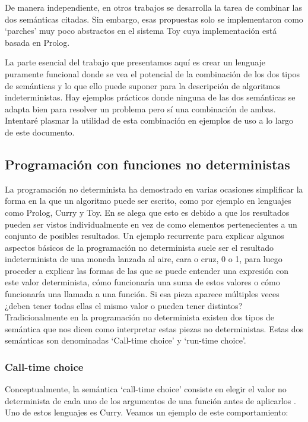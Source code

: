 \documentclass[class=article, crop=false]{standalone}
\begin{document}
De manera independiente, en otros trabajos \cite{riesco2014singular} se desarrolla la tarea
de combinar las dos semánticas citadas. Sin embargo, esas propuestas solo se implementaron
como `parches' muy poco abstractos en el sistema Toy cuya implementación está basada en
Prolog.

La parte esencial del trabajo que presentamos aquí es crear un lenguaje puramente funcional
donde se vea el potencial de la combinación de los dos tipos de semánticas y lo que ello
puede suponer para la descripción de algoritmos indeterministas. Hay ejemplos prácticos donde
ninguna de las dos semánticas se adapta bien para resolver un problema pero sí una
combinación de ambas. Intentaré plasmar la utilidad de esta combinación en ejemplos de uso a
lo largo de este documento.

\subsection{Programación con funciones no deterministas}\label{sec:prog_func_ind}
La programación no determinista ha demostrado en varias ocasiones simplificar la forma en la
que un algoritmo puede ser escrito, como por ejemplo en lenguajes como Prolog, Curry y Toy.
En \cite{antoy2010functional} se alega que esto es debido a que los resultados pueden ser
vistos individualmente en vez de como elementos pertenecientes a un conjunto de posibles
resultados. Un ejemplo recurrente para explicar algunos aspectos básicos de la programación
no determinista suele ser el resultado indeterminista de una moneda lanzada al aire, cara o
cruz, 0 o 1, para luego proceder a explicar las formas de las que se puede entender una
expresión con este valor determinista, cómo funcionaría una suma de estos valores o cómo
funcionaría una llamada a una función. Si esa pieza aparece múltiples veces ¿deben tener
todas ellas el mismo valor o pueden tener distintos? Tradicionalmente en la programación no
determinista existen dos tipos de semántica que nos dicen como interpretar estas piezas no
deterministas. Estas dos semánticas son denominadas `Call-time choice' y `run-time choice'.

\subsubsection{Call-time choice}
Conceptualmente, la semántica `call-time choice' consiste en elegir el valor no determinista
de cada uno de los argumentos de una función antes de aplicarlos \cite{fischer2011purely}.
Uno de estos lenguajes es Curry. Veamos un ejemplo de este comportamiento:
\end{document}
